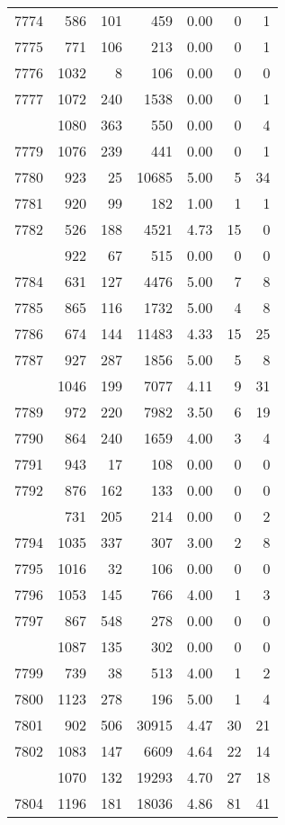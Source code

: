 \documentclass[
]{article}
\begin{document}
\begin{table}
\begin{tabular}[t]{lrrrrrr}
7774 & 586 & 101 & 459 & 0.00 & 0 & 1\\
7775 & 771 & 106 & 213 & 0.00 & 0 & 1\\
7776 & 1032 & 8 & 106 & 0.00 & 0 & 0\\
7777 & 1072 & 240 & 1538 & 0.00 & 0 & 1\\
\addlinespace
7778 & 1080 & 363 & 550 & 0.00 & 0 & 4\\
7779 & 1076 & 239 & 441 & 0.00 & 0 & 1\\
7780 & 923 & 25 & 10685 & 5.00 & 5 & 34\\
7781 & 920 & 99 & 182 & 1.00 & 1 & 1\\
7782 & 526 & 188 & 4521 & 4.73 & 15 & 0\\
\addlinespace
7783 & 922 & 67 & 515 & 0.00 & 0 & 0\\
7784 & 631 & 127 & 4476 & 5.00 & 7 & 8\\
7785 & 865 & 116 & 1732 & 5.00 & 4 & 8\\
7786 & 674 & 144 & 11483 & 4.33 & 15 & 25\\
7787 & 927 & 287 & 1856 & 5.00 & 5 & 8\\
\addlinespace
7788 & 1046 & 199 & 7077 & 4.11 & 9 & 31\\
7789 & 972 & 220 & 7982 & 3.50 & 6 & 19\\
7790 & 864 & 240 & 1659 & 4.00 & 3 & 4\\
7791 & 943 & 17 & 108 & 0.00 & 0 & 0\\
7792 & 876 & 162 & 133 & 0.00 & 0 & 0\\
\addlinespace
7793 & 731 & 205 & 214 & 0.00 & 0 & 2\\
7794 & 1035 & 337 & 307 & 3.00 & 2 & 8\\
7795 & 1016 & 32 & 106 & 0.00 & 0 & 0\\
7796 & 1053 & 145 & 766 & 4.00 & 1 & 3\\
7797 & 867 & 548 & 278 & 0.00 & 0 & 0\\
\addlinespace
7798 & 1087 & 135 & 302 & 0.00 & 0 & 0\\
7799 & 739 & 38 & 513 & 4.00 & 1 & 2\\
7800 & 1123 & 278 & 196 & 5.00 & 1 & 4\\
7801 & 902 & 506 & 30915 & 4.47 & 30 & 21\\
7802 & 1083 & 147 & 6609 & 4.64 & 22 & 14\\
\addlinespace
7803 & 1070 & 132 & 19293 & 4.70 & 27 & 18\\
7804 & 1196 & 181 & 18036 & 4.86 & 81 & 41\\

\end{tabular}
\end{table}
\end{document}
